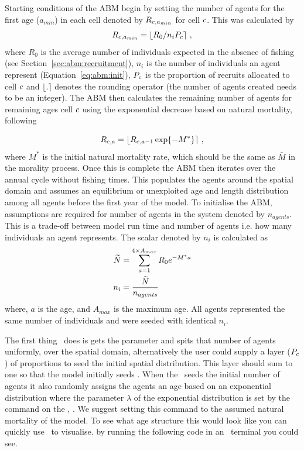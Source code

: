 Starting conditions of the ABM begin by setting the number of agents for the first age (\(a_{min}\)) in each cell denoted by \(R_{c,a_{min}}\) for cell \(c\). This was calculated by
\[
R_{c,a_{min}} = \lfloor R_0/n_i P_{c} \rceil  \ ,
\]
where \(R_0\) is the average number of individuals expected in the absence of fishing  (see Section~\ref{sec:abm:recruitment}), \(n_i\) is the number of individuals an agent represent (Equation~\ref{eq:abm:init}), \(P_{c}\) is the proportion of recruits allocated to cell \(c\) and \(\lfloor . \rceil\) denotes the rounding operator (the number of agents created needs to be an integer). The ABM then calculates the remaining number of agents for remaining ages cell \(c\) using the exponential decrease based on natural mortality, following

\[
R_{c,a} =\lfloor R_{c,a - 1} \exp \{-{M^*}\} \rceil  \ ,
\]
where \(M^*\) is the initial natural mortality rate, which should be the same as \(\bar{M}\) in the morality process. Once this is complete the ABM then iterates over the annual cycle without fishing  times. This populates the agents around the spatial domain and assumes an equilibrium or unexploited age and length distribution among all agents before the first year of the model. To initialise the ABM, assumptions are required for number of agents in the system denoted by \(n_{agents}\). This is a trade-off between model run time and number of agents i.e. how many individuals an agent represents. The scalar denoted by \(n_i\) is calculated as
\begin{align}
\widetilde{N} &= \sum\limits_{a = 1}^{4\times A_{max}} R_0 e^{-M^* a} \label{eq:abm:init}\\
n_i &= \frac{\widetilde{N}}{n_{agents}} \, \nonumber
\end{align}
where, \(a\) is the age, and \(A_{max}\) is the maximum age. All agents represented the same number of individuals and were seeded with identical \(n_i\). 


The first thing \IBM\ does is gets the parameter  and spits that number of agents uniformly, over the spatial domain, alternatively the user could supply a layer  (\(P_{c}\)) of proportions to seed the initial spatial distribution. This layer should sum to one so that the model initially seeds . When the \IBM\ seeds the initial number of agents it also randomly assigns the agents an age based on an exponential distribution where the parameter $\lambda$ of the exponential distribution is set by the command on the , . We suggest setting this command to the assumed natural mortality of the model. To see what age structure this would look like you can quickly use \R\ to visualise. by running the following code in an \R\ terminal you could see.

